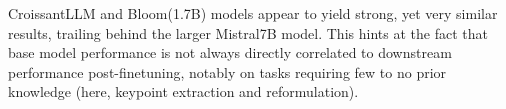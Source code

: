 
\renewcommand{\arraystretch}{1.0}
\setlength{\tabcolsep}{4pt} %

\begin{table}[ht]
    \centering
    \small %
    \caption[Dialog summarization results]{Dialog summarization results. Except ROUGE-1, scores are measured by GPT-4, out of 5.}
    \label{tab:sum-finetuned-1}
\end{table}



CroissantLLM and Bloom(1.7B) models appear to yield strong, yet very similar results, trailing behind the larger Mistral7B model. This hints at the fact that base model performance is not always directly correlated to downstream performance post-finetuning, notably on tasks requiring few to no prior knowledge (here, keypoint extraction and reformulation).


